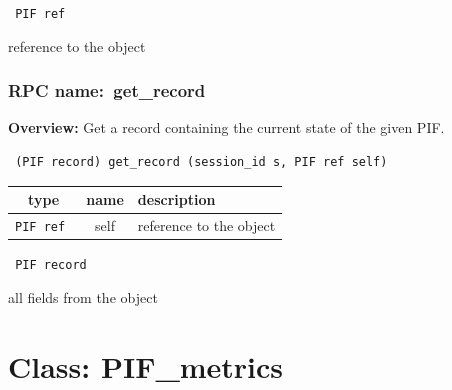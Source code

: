 \vspace{0.3cm}

{\tt 
PIF ref
}


reference to the object
\vspace{0.3cm}
\vspace{0.3cm}
\vspace{0.3cm}
\subsubsection{RPC name:~get\_record}

{\bf Overview:} 
Get a record containing the current state of the given PIF.

\begin{verbatim} (PIF record) get_record (session_id s, PIF ref self)\end{verbatim}



 
\vspace{0.3cm}
\begin{tabular}{|c|c|p{7cm}|}
 \hline
{\bf type} & {\bf name} & {\bf description} \\ \hline
{\tt PIF ref } & self & reference to the object \\ \hline 

\end{tabular}

\vspace{0.3cm}

{\tt 
PIF record
}


all fields from the object
\vspace{0.3cm}
\vspace{0.3cm}
\vspace{0.3cm}

\vspace{1cm}
\newpage
\section{Class: PIF\_metrics}
